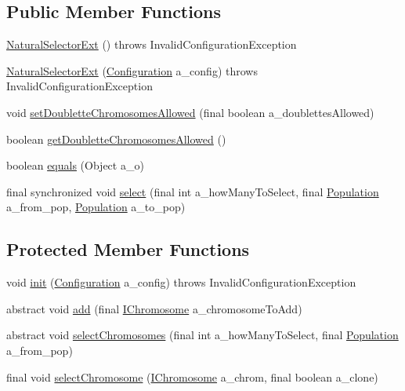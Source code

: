 \subsection*{Public Member Functions}
\begin{DoxyCompactItemize}
\item 
\hyperlink{classorg_1_1jgap_1_1_natural_selector_ext_a07fbce4646a51d8dbac653f85aa2dd07}{Natural\-Selector\-Ext} ()  throws Invalid\-Configuration\-Exception 
\item 
\hyperlink{classorg_1_1jgap_1_1_natural_selector_ext_ae56adaa72d97b09f44e29832db0913f8}{Natural\-Selector\-Ext} (\hyperlink{classorg_1_1jgap_1_1_configuration}{Configuration} a\-\_\-config)  throws Invalid\-Configuration\-Exception 
\item 
void \hyperlink{classorg_1_1jgap_1_1_natural_selector_ext_aaae7ddb53108703f9de14639f48889e8}{set\-Doublette\-Chromosomes\-Allowed} (final boolean a\-\_\-doublettes\-Allowed)
\item 
boolean \hyperlink{classorg_1_1jgap_1_1_natural_selector_ext_a1fb87b0d55b3fb5a3cd84b159a9b97ff}{get\-Doublette\-Chromosomes\-Allowed} ()
\item 
boolean \hyperlink{classorg_1_1jgap_1_1_natural_selector_ext_a8ef9cd66bddceccecd03a9670354a7aa}{equals} (Object a\-\_\-o)
\item 
final synchronized void \hyperlink{classorg_1_1jgap_1_1_natural_selector_ext_ab7eac27131f30abd83bd1eec964be8af}{select} (final int a\-\_\-how\-Many\-To\-Select, final \hyperlink{classorg_1_1jgap_1_1_population}{Population} a\-\_\-from\-\_\-pop, \hyperlink{classorg_1_1jgap_1_1_population}{Population} a\-\_\-to\-\_\-pop)
\end{DoxyCompactItemize}
\subsection*{Protected Member Functions}
\begin{DoxyCompactItemize}
\item 
void \hyperlink{classorg_1_1jgap_1_1_natural_selector_ext_a2463922ff619e3fdb7273afa25119cfa}{init} (\hyperlink{classorg_1_1jgap_1_1_configuration}{Configuration} a\-\_\-config)  throws Invalid\-Configuration\-Exception 
\item 
abstract void \hyperlink{classorg_1_1jgap_1_1_natural_selector_ext_ab42019c92f31cc0c859202b0ae3b4e96}{add} (final \hyperlink{interfaceorg_1_1jgap_1_1_i_chromosome}{I\-Chromosome} a\-\_\-chromosome\-To\-Add)
\item 
abstract void \hyperlink{classorg_1_1jgap_1_1_natural_selector_ext_a86725d343805cef081f381b51423ce2b}{select\-Chromosomes} (final int a\-\_\-how\-Many\-To\-Select, final \hyperlink{classorg_1_1jgap_1_1_population}{Population} a\-\_\-from\-\_\-pop)
\item 
final void \hyperlink{classorg_1_1jgap_1_1_natural_selector_ext_ad330fe572e650caf3549d5896beb40a9}{select\-Chromosome} (\hyperlink{interfaceorg_1_1jgap_1_1_i_chromosome}{I\-Chromosome} a\-\_\-chrom, final boolean a\-\_\-clone)
\end{DoxyCompactItemize}
